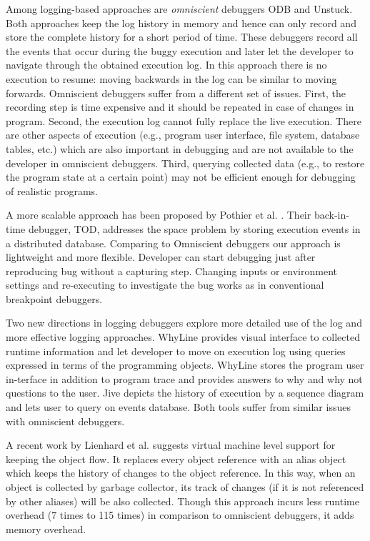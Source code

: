 \documentclass[preprint]{sigplanconf}
\begin{document}
Among logging-based approaches are \textit{omniscient} debuggers
ODB\cite{Lewis} and Unstuck\cite{Hofer}. Both
approaches keep the log history in memory and hence can only record
and store the complete history for a short period of time. These
debuggers record all the events that occur during the buggy execution
and later let the developer to navigate through the obtained execution
log. In this approach there is no execution to resume: moving
backwards in the log can be similar to moving forwards. Omniscient
debuggers suffer from a different set of issues. First, the recording
step is time expensive and it should be repeated in case of changes in
program. Second, the execution log cannot fully replace the live
execution. There are other aspects of execution (e.g., program user
interface, file system, database tables, etc.) which are also
important in debugging and are not available to the developer in
omniscient debuggers. Third, querying collected data (e.g., to restore
the program state at a certain point) may not be efficient enough for
debugging of realistic programs.

A more scalable approach has been proposed by Pothier et
al. \cite{Pothier}. Their back-in-time debugger, TOD, addresses the
space problem by storing execution events in a distributed
database. Comparing to Omniscient debuggers our approach is
lightweight and more flexible. Developer can start debugging just
after reproducing bug without a capturing step.  Changing inputs or
environment settings and re-executing to investigate the bug works as
in conventional breakpoint debuggers.

Two new directions in logging debuggers explore more detailed use of
the log and more effective logging approaches. WhyLine\cite{Ko}
provides visual interface to collected runtime information and let
developer to move on execution log using queries expressed in terms of
the programming objects. WhyLine stores the program user in-terface in
addition to program trace and provides answers to why and why not
questions to the user. Jive\cite{Czyz} depicts the history of
execution by a sequence diagram and lets user to query on events
database. Both tools suffer from similar issues with omniscient
debuggers.

A recent work by Lienhard et al.\cite{Lienhard} suggests virtual
machine level support for keeping the object flow. It replaces every
object reference with an alias object which keeps the history of
changes to the object reference. In this way, when an object is
collected by garbage collector, its track of changes (if it is not
referenced by other aliases) will be also collected. Though this
approach incurs less runtime overhead (7 times to 115 times) in
comparison to omniscient debuggers, it adds memory
overhead. 
\end{document}
